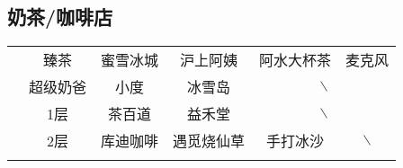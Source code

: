 \subsection[奶茶/咖啡店]{奶茶/咖啡店}
\begin{table}[H]
    \centering
    \begin{tabular}{|c|c|c|c|c|c|}
        \Xhline{1.2pt}
        \multirow{2}{*}{食堂} & 臻茶                                & 蜜雪冰城         & 沪上阿姨  %
                            & 阿水大杯茶                             & 麦克风                  \\
        \cline{2-6}
                            & 超级奶爸                              & 小度           & 冰雪岛   %
                            & \multicolumn{2}{c|}{$\backslash$}                        \\
        \Xhline{1.2pt}
        \multirow{2}{*}{大服} & 1层                                & 茶百道          & 益禾堂   %
                            & \multicolumn{2}{c|}{$\backslash$}                        \\
        \cline{2-6}
                            & 2层                                & 库迪咖啡         & 遇觅烧仙草 %
                            & 手打冰沙                              & $\backslash$         \\
        \Xhline{1.2pt}
    \end{tabular}
\end{table}

